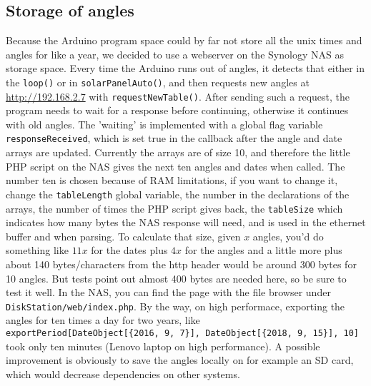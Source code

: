 		\subsection{Storage of angles}\label{subsec:storageOfAngles}
			Because the Arduino program space could by far not store all the unix times and angles for like a year, we decided to use a webserver on the Synology NAS as storage space.
			Every time the Arduino runs out of angles, it detects that either in the \verb|loop()| or in \verb|solarPanelAuto()|, and then requests new angles at \url{http://192.168.2.7} with \verb|requestNewTable()|. After sending such a request, the program needs to wait for a response before continuing, otherwise it continues with old angles.
			The 'waiting' is implemented with a global flag variable \verb|responseReceived|, which is set true in the callback after the angle and date arrays are updated.
			Currently the arrays are of size 10, and therefore the little PHP script on the NAS gives the next ten angles and dates when called.
			The number ten is chosen because of RAM limitations, if you want to change it, change the \verb|tableLength| global variable, the number in the declarations of the arrays, the number of times the PHP script gives back, the \verb|tableSize| which indicates how many bytes the NAS response will need, and is used in the ethernet buffer and when parsing.
			To calculate that size, given $x$ angles, you'd do something like $11x$ for the dates plus $4x$ for the angles and a little more plus about 140 bytes/characters from the http header would be around 300 bytes for 10 angles.
			But tests point out almost 400 bytes are needed here, so be sure to test it well.
			In the NAS, you can find the page with the file browser under \verb|DiskStation/web/index.php|.
			By the way, on high performace, exporting the angles for ten times a day for two years, like \\ \verb|exportPeriod[DateObject[{2016, 9, 7}], DateObject[{2018, 9, 15}], 10]| took only ten minutes (Lenovo laptop on high performance).
			A possible improvement is obviously to save the angles locally on for example an SD card, which would decrease dependencies on other systems.
